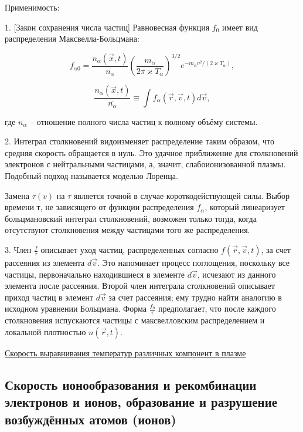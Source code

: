 \documentclass[10pt, a4paper]{article}
\numberwithin{equation}{section}
\begin{document}
Применимость:

1. [Закон сохранения числа частиц] Равновесная функция $f_0$ имеет вид распределения Максвелла-Больцмана:

\begin{equation*}
	f_{\alpha 0} = \frac{n_\alpha(\vec{x}, t)}{\overline{n_\alpha}} \left( \frac{m_\alpha}{2\pi \varkappa T_\alpha}\right)^{3/2}e^{-m_\alpha v^2/(2\varkappa T_\alpha)}, 
\end{equation*}

\begin{equation*}
	\frac{n_\alpha(\vec{x}, t)}{\overline{n_\alpha}} \equiv \int f_\alpha (\vec{r}, \vec{v}, t) d\vec{v},
\end{equation*}

где $\overline{n_\alpha}$ -- отношение полного числа частиц к полному объёму системы.

2. Интеграл столкновений видоизменяет распределение таким
образом, что средняя скорость обращается в нуль. Это удачное приближение для столкновений электронов с нейтральными частицами, а, значит, слабоионизованной плазмы. Подобный подход называется моделью Лоренца.

Замена $\tau(v)$ на $\tau$ является точной в случае короткодействующей силы. Выбор времени т, не зависящего от функции распределения $f_\alpha$, который линеаризует больцмановский интеграл
столкновений, возможен только тогда, когда отсутствуют столкновения
между частицами того же распределения.

3. Член $\frac{f}{\tau}$ описывает уход частиц, распределенных согласно
$f(\vec{r}, \vec{v}, t)$, за счет рассеяния из элемента $d\vec{v}$. Это напоминает процесс поглощения, поскольку все частицы, первоначально находившиеся в элементе $d\vec{v}$, исчезают из данного элемента после рассеяния. Второй член интеграла столкновений описывает приход частиц в элемент $d\vec{v}$ за счет рассеяния;
ему трудно найти аналогию в исходном уравнении Больцмана. Форма $\frac{f_0}{\tau}$ предполагает, что после каждого столкновения испускаются частицы с максвелловским распределением и локальной плотностью $n(\vec{r}, t)$.

\uline{Скорость выравнивания температур различных компонент в плазме}



\subsection{Скорость ионообразования и рекомбинации электронов и ионов, образование и разрушение возбуждённых атомов (ионов)}
\end{document}
